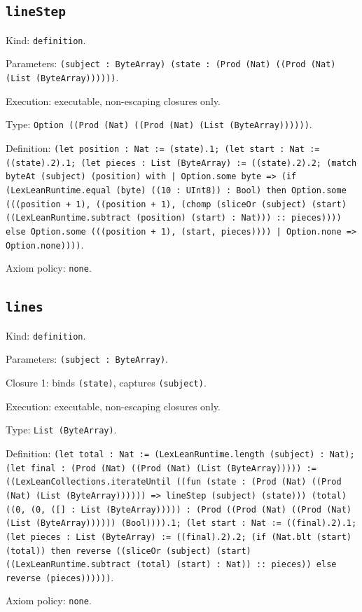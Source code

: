 \documentclass[11pt]{article}
\begin{document}
\subsection*{\texttt{lineStep}}
\noindent Kind: \texttt{definition}.\par
\noindent Parameters: \texttt{(subject : ByteArray) (state : (Prod (Nat) ((Prod (Nat) (List (ByteArray))))))}.\par
\noindent Execution: executable, non-escaping closures only.\par
\noindent Type: \texttt{Option ((Prod (Nat) ((Prod (Nat) (List (ByteArray))))))}.\par
\noindent Definition: \texttt{(let position : Nat := (state).1; (let start : Nat := ((state).2).1; (let pieces : List (ByteArray) := ((state).2).2; (match byteAt (subject) (position) with | Option.some byte => (if (LexLeanRuntime.equal (byte) ((10 : UInt8)) : Bool) then Option.some (((position + 1), ((position + 1), (chomp (sliceOr (subject) (start) ((LexLeanRuntime.subtract (position) (start) : Nat))) :: pieces)))) else Option.some (((position + 1), (start, pieces)))) | Option.none => Option.none))))}.\par
\noindent Axiom policy: \texttt{none}.\par
\subsection*{\texttt{lines}}
\noindent Kind: \texttt{definition}.\par
\noindent Parameters: \texttt{(subject : ByteArray)}.\par
\noindent Closure 1: binds \texttt{(state)}, captures \texttt{(subject)}.\par
\noindent Execution: executable, non-escaping closures only.\par
\noindent Type: \texttt{List (ByteArray)}.\par
\noindent Definition: \texttt{(let total : Nat := (LexLeanRuntime.length (subject) : Nat); (let final : (Prod (Nat) ((Prod (Nat) (List (ByteArray))))) := ((LexLeanCollections.iterateUntil ((fun (state : (Prod (Nat) ((Prod (Nat) (List (ByteArray)))))) => lineStep (subject) (state))) (total) ((0, (0, ([] : List (ByteArray))))) : (Prod ((Prod (Nat) ((Prod (Nat) (List (ByteArray)))))) (Bool)))).1; (let start : Nat := ((final).2).1; (let pieces : List (ByteArray) := ((final).2).2; (if (Nat.blt (start) (total)) then reverse ((sliceOr (subject) (start) ((LexLeanRuntime.subtract (total) (start) : Nat)) :: pieces)) else reverse (pieces))))))}.\par
\noindent Axiom policy: \texttt{none}.\par
\end{document}
